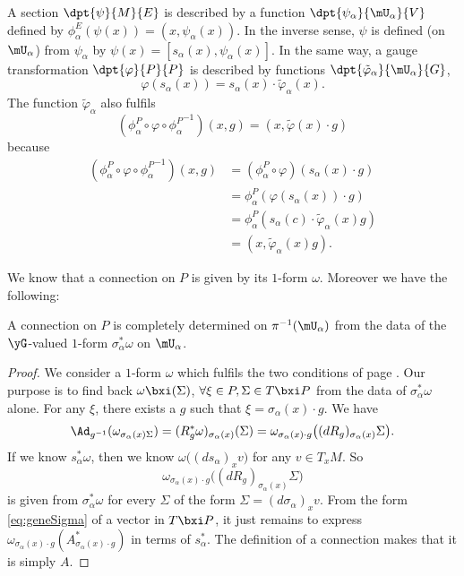 A section $\dpt{\psi}{M}{E}$ is described by a function $\dpt{\psi_{\alpha}}{\mU_{\alpha}}{V}$ defined by $\phi^E_{\alpha}(\psi(x))=(x,\psi_{\alpha}(x))$.  In the inverse sense, $\psi$ is defined (on $\mU_{\alpha}$) from $\psi_{\alpha}$ by
$\psi(x)=[s_{\alpha}(x),\psi_{\alpha}(x)]$.
In the same way, a gauge transformation $\dpt{\varphi}{P}{P}$ is described by functions $\dpt{\tilde{\varphi}_{\alpha}}{\mU_{\alpha}}{G}$,
\begin{equation}
	\varphi(s_{\alpha}(x))=s_{\alpha}(x)\cdot\tilde{\varphi}_{\alpha}(x).
\end{equation}
The function $\tilde{\varphi}_{\alpha}$ also fulfils
\begin{equation}
	(\phi_{\alpha}^P\circ\varphi\circ{\phi_{\alpha}^P}^{-1})(x,g)=(x,\tilde{\varphi}(x)\cdot g)
\end{equation}
because
\begin{equation}
	\begin{split}
		(\phi_{\alpha}^P\circ\varphi\circ{\phi_{\alpha}^P}^{-1})(x,g)&=(\phi_{\alpha}^P\circ\varphi)(s_{\alpha}(x)\cdot g)\\
		&=\phi_{\alpha}^P( \varphi(s_{\alpha}(x))\cdot g )\\
		&=\phi_{\alpha}^P( s_{\alpha}(c)\cdot\tilde{\varphi}_{\alpha}(x)g)\\
		&=(x,\tilde{\varphi}_{\alpha}(x)g).
	\end{split}
\end{equation}

We know that a connection on $P$ is given by its $1$-form $\omega$. Moreover we have the following:
\begin{proposition}
	A connection on $P$ is completely determined on $\pi^{-1}(\mU_{\alpha})$ from the data of the $\yG$-valued $1$-form $\sigma_{\alpha}^*\omega$ on $\mU_{\alpha}$.
\end{proposition}

\begin{proof}
	We consider a $1$-form $\omega$ which fulfils the two conditions of page \pageref{pg:def:conne}. Our purpose is to find back $\omega\bxi(\Sigma)$, $\forall\xi\in P,\Sigma\in T\bxi P$ from the data of $\sigma_{\alpha}^*\omega$ alone. For any $\xi$, there exists a $g$ such that $\xi=\sigma_{\alpha}(x)\cdot g$. We have
	\begin{equation}
		\Ad_{g^{-1}}(\omega_{\sigma_{\alpha}(x)\Sigma})=(R^*_g\omega)_{\sigma_{\alpha}(x)}(\Sigma)
		=\omega_{\sigma_{\alpha}(x)\cdot g}\big( (dR_g)_{\sigma_{\alpha}(x)}\Sigma \big).
	\end{equation}
	If we know $s_{\alpha}^*\omega$, then we know $\omega\big(  (ds_{\alpha})_xv  \big)$ for any $v\in T_xM$. So
	\[
		\omega_{\sigma_{\alpha}(x)\cdot g}\big( (dR_g)_{\sigma_{\alpha}(x)}\Sigma\big)
	\]
	is given from $\sigma_{\alpha}^*\omega$ for every $\Sigma$ of the form $\Sigma=(d\sigma_{\alpha})_xv$. From the form \eqref{eq:geneSigma} of a vector in $T\bxi P$, it just remains to express $\omega_{\sigma_{\alpha}(x)\cdot g}(A^*_{\sigma_{\alpha}(x)\cdot g})$ in terms of $s_{\alpha}^*$. The definition of a connection makes that it is simply $A$.

\end{proof}

